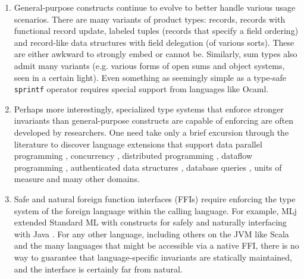 \documentclass[9pt,preprint]{sigplanconf}
\newcommand{\compresslist}{
  \vspace{-1em}
  \setlength{\itemsep}{1pt}
  \setlength{\parskip}{0pt}
  \setlength{\parsep}{0pt}
}
\begin{document}
\begin{enumerate}
\item General-purpose constructs continue to evolve to better handle various usage scenarios. There are many  variants of product types: records, records with functional record update, labeled tuples (records that specify a field ordering) and record-like data structures with field delegation (of various sorts). These are  either awkward to strongly embed or cannot be. Similarly, sum types also admit many variants (e.g. various forms of open sums and object systems, seen in a certain light). Even something as seemingly simple as a type-safe \verb|sprintf| operator requires special support from languages like Ocaml.
\item Perhaps more interestingly, specialized type systems that enforce stronger invariants than general-purpose constructs are capable of enforcing are often developed by researchers. One need take only a brief  excursion through the literature to discover language extensions that support data parallel programming \cite{chakravarty2007data}, concurrency \cite{reppy1993concurrent}, distributed programming \cite{Murphy:2007:TDP:1793574.1793585}, dataflow programming \cite{mandel2005reactiveml}, authenticated data structures \cite{Miller:2014:ADS:2535838.2535851}, database queries \cite{Ohori:2011:MSM:2034773.2034815},  units of measure \cite{conf/cefp/Kennedy09} and many other domains.%
\item Safe and natural foreign function interfaces (FFIs) require enforcing the type system of the foreign language within the calling language. %
For example, MLj extended Standard ML with constructs for safely and naturally interfacing with Java \cite{benton1999interlanguage}. For any other language, including  others on the JVM like Scala and the many languages that might be accessible via a native FFI, there is no way to guarantee that language-specific invariants are statically maintained, and the interface is certainly far from natural.
\end{enumerate}
\end{document}
